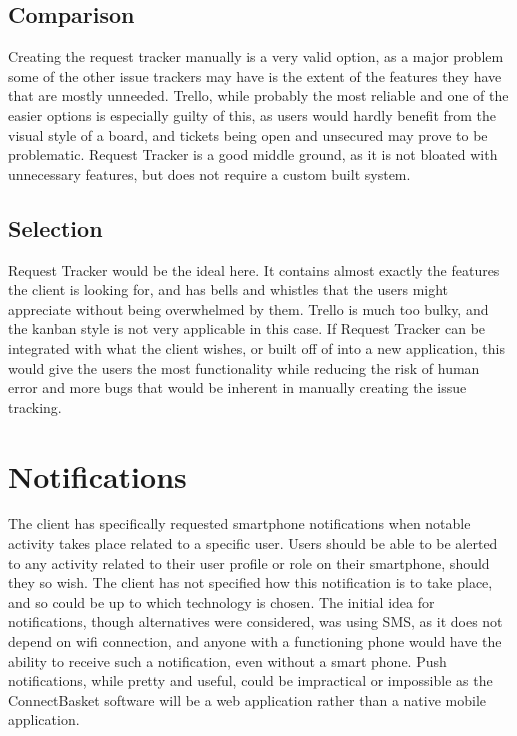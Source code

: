 \documentclass[onecolumn, draftclsnofoot,10pt, compsoc]{IEEEtran}
\begin{document}
\subsection{Comparison}
Creating the request tracker manually is a very valid option, as a major problem some of the other issue trackers may have is the extent of the features they have that are mostly 
unneeded. Trello, while probably the most reliable and one of the easier options is especially guilty of this, as users would hardly benefit from the visual style of a board, and 
tickets being open and unsecured may prove to be problematic. Request Tracker is a good middle ground, as it is not bloated with unnecessary features, but does not require a custom
built system.
\subsection{Selection}
Request Tracker would be the ideal here. It contains almost exactly the features the client is looking for, and has bells and whistles that the users might appreciate without being 
overwhelmed by them. Trello is much too bulky, and the kanban style is not very applicable in this case. If Request Tracker can be integrated with what the client wishes, or built off 
of into a new application, this would give the users the most functionality while reducing the risk of human error and more bugs that would be inherent in manually creating the issue 
tracking.


\section{Notifications}
The client has specifically requested smartphone notifications when notable activity takes place related to a specific user. Users should be able to be alerted to any activity 
related to their user profile or role on their smartphone, should they so wish. The client has not specified how this notification is to take place, and so could be up to which technology 
is chosen. The initial idea for notifications, though alternatives were considered, was using SMS, as it does not depend on wifi connection, and anyone with a functioning phone would 
have the ability to receive such a notification, even without a smart phone. Push notifications, while pretty and useful, could be impractical or impossible as the ConnectBasket software 
will be a web application rather than a native mobile application.
\end{document}
